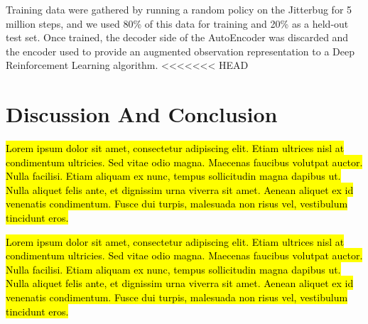 \documentclass[letterpaper, 10 pt, conference]{ieeeconf}
\begin{document}
Training data were gathered by running a random policy on the Jitterbug for 5 million steps, and we used 80\% of this data for training and 20\% as a held-out test set.
Once trained, the decoder side of the AutoEncoder was discarded and the encoder used to provide an augmented observation representation to a Deep Reinforcement Learning algorithm.
<<<<<<< HEAD

\section{Discussion And Conclusion}

\hl{Lorem ipsum dolor sit amet, consectetur adipiscing elit. Etiam ultrices nisl at condimentum ultricies. Sed vitae odio magna. Maecenas faucibus volutpat auctor. Nulla facilisi. Etiam aliquam ex nunc, tempus sollicitudin magna dapibus ut. Nulla aliquet felis ante, et dignissim urna viverra sit amet. Aenean aliquet ex id venenatis condimentum. Fusce dui turpis, malesuada non risus vel, vestibulum tincidunt eros.}

\hl{Lorem ipsum dolor sit amet, consectetur adipiscing elit. Etiam ultrices nisl at condimentum ultricies. Sed vitae odio magna. Maecenas faucibus volutpat auctor. Nulla facilisi. Etiam aliquam ex nunc, tempus sollicitudin magna dapibus ut. Nulla aliquet felis ante, et dignissim urna viverra sit amet. Aenean aliquet ex id venenatis condimentum. Fusce dui turpis, malesuada non risus vel, vestibulum tincidunt eros.}



\end{document}
